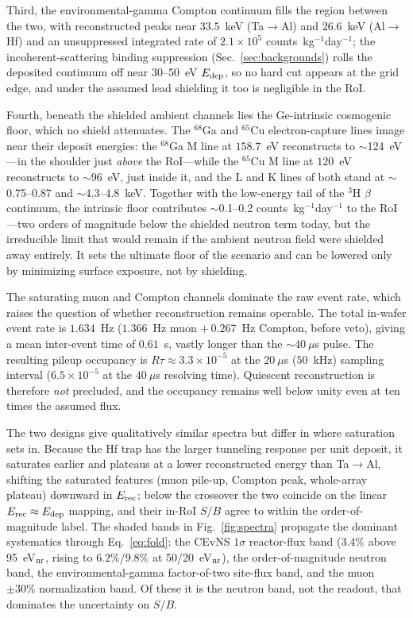 Third, the environmental-gamma Compton continuum fills the region between the two, with reconstructed peaks near $33.5$~keV (Ta$\to$Al) and $26.6$~keV (Al$\to$Hf) and an unsuppressed integrated rate of $2.1\times10^{5}$ counts~kg$^{-1}$day$^{-1}$; the incoherent-scattering binding suppression (Sec.~\ref{sec:backgrounds}) rolls the deposited continuum off near $30$--$50$~eV $E_{\rm dep}$, so no hard cut appears at the grid edge, and under the assumed lead shielding it too is negligible in the RoI.

Fourth, beneath the shielded ambient channels lies the Ge-intrinsic cosmogenic floor, which no shield attenuates. The $^{68}$Ga and $^{65}$Cu electron-capture lines image near their deposit energies: the $^{68}$Ga M line at $158.7$~eV reconstructs to $\sim$124~eV---in the shoulder just \emph{above} the RoI---while the $^{65}$Cu M line at $120$~eV reconstructs to $\sim$96~eV, just inside it, and the L and K lines of both stand at $\sim$0.75--0.87 and $\sim$4.3--4.8~keV. Together with the low-energy tail of the $^{3}$H $\beta$ continuum, the intrinsic floor contributes $\sim$0.1--0.2 counts~kg$^{-1}$day$^{-1}$ to the RoI---two orders of magnitude below the shielded neutron term today, but the irreducible limit that would remain if the ambient neutron field were shielded away entirely. It sets the ultimate floor of the scenario and can be lowered only by minimizing surface exposure, not by shielding.

The saturating muon and Compton channels dominate the raw event rate, which raises the question of whether reconstruction remains operable. The total in-wafer event rate is $1.634$~Hz ($1.366$~Hz muon $+\,0.267$~Hz Compton, before veto), giving a mean inter-event time of $0.61$~s, vastly longer than the $\sim$$40~\mu$s pulse. The resulting pileup occupancy is $R\tau\approx3.3\times10^{-5}$ at the $20~\mu$s ($50$~kHz) sampling interval ($6.5\times10^{-5}$ at the $40~\mu$s resolving time). Quiescent reconstruction is therefore \emph{not} precluded, and the occupancy remains well below unity even at ten times the assumed flux.

The two designs give qualitatively similar spectra but differ in where saturation sets in. Because the Hf trap has the larger tunneling response per unit deposit, it saturates earlier and plateaus at a lower reconstructed energy than Ta$\to$Al, shifting the saturated features (muon pile-up, Compton peak, whole-array plateau) downward in $E_{\rm rec}$; below the crossover the two coincide on the linear $E_{\rm rec}\approx E_{\rm dep}$ mapping, and their in-RoI $S/B$ agree to within the order-of-magnitude label. The shaded bands in Fig.~\ref{fig:spectra} propagate the dominant systematics through Eq.~\eqref{eq:fold}: the CEvNS $1\sigma$ reactor-flux band ($3.4\%$ above 95~eV$_{\rm nr}$, rising to $6.2\%$/$9.8\%$ at 50/20~eV$_{\rm nr}$), the order-of-magnitude neutron band, the environmental-gamma factor-of-two site-flux band, and the muon $\pm30\%$ normalization band. Of these it is the neutron band, not the readout, that dominates the uncertainty on $S/B$.
